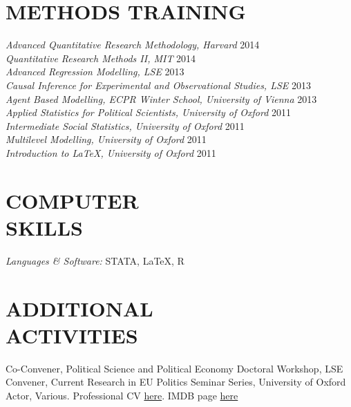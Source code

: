 \documentclass[line,margin]{res}
\begin{document}
\begin{resume}
\section{METHODS TRAINING}	
{\sl Advanced Quantitative Research Methodology, Harvard} \hfill 2014 \\
{\sl Quantitative Research Methods II, MIT} \hfill 2014 \\
{\sl Advanced Regression Modelling, LSE} \hfill 2013 \\
{\sl Causal Inference for Experimental and Observational Studies, LSE} \hfill 2013 \\
{\sl Agent Based Modelling, ECPR Winter School, University of Vienna} \hfill 2013\\
{\sl Applied Statistics for Political Scientists, University of Oxford} \hfill 2011 \\			
 {\sl Intermediate Social Statistics, University of Oxford} \hfill 2011 \\
{\sl Multilevel Modelling, University of Oxford} \hfill 2011 \\
{\sl Introduction to \LaTeX, University of Oxford} \hfill 2011 \\


\section{COMPUTER \\ SKILLS} {\sl Languages \& Software:} STATA, \LaTeX, R \\


\section{ADDITIONAL \\ ACTIVITIES}             
            Co-Convener, Political Science and Political Economy Doctoral Workshop, LSE \\
            Convener, Current Research in EU Politics Seminar Series, University of Oxford \\
            Actor, Various. Professional CV \href{http://www.spotlight.com/2219-7831-0442}{here}. IMDB page \href{http://www.imdb.com/name/nm0089773/?ref_=nmbio_bio_nm}{here}
 

\end{resume}
\end{document}
